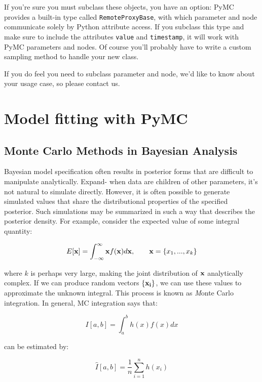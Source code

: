 \documentclass[]{book}
\begin{document}
If you're sure you must subclass these objects, you have an option: PyMC provides a built-in type called \texttt{RemoteProxyBase}, with which parameter and node communicate solely by Python attribute access. If you subclass this type and make sure to include the attributes \texttt{value} and \texttt{timestamp}, it will work with PyMC parameters and nodes. Of course you'll probably have to write a custom sampling method to handle your new class.

If you do feel you need to subclass parameter and node, we'd like to know about your usage case, so please contact us.

\chapter{Model fitting with PyMC} %
\label{chap:MCMC}


\section{Monte Carlo Methods in Bayesian Analysis}

Bayesian model specification often results in posterior forms that are difficult to manipulate analytically. Expand- when data are children of other parameters, it's not natural to simulate directly. However, it is often possible to generate simulated values that share the distributional properties of the specified posterior. Such simulations may be summarized in such a way that describes the posterior density. For example, consider the expected value of some integral quantity:

\[
E[{\bf x}] = \int_{-\infty}^{\infty} {\bf x} f({\bf x}) d{\bf x}, \qquad
{\bf x} = \{x_1,...,x_k\}
\]

\noindent where $k$ is perhaps very large, making the joint distribution of ${\bf x}$ analytically complex. If we can produce random vectors $\{{\bf x_i}\}$, we can use these values to approximate the unknown integral. This process is known as {\emph Monte Carlo integration}. In general, MC integration says that:

\[
I[a,b] = \int_a^b h(x) f(x) dx
\]

\noindent can be estimated by:

\[
\hat{I}[a,b] = \frac{1}{n}\sum_{i=1}^n h(x_i)
\]
\end{document}
